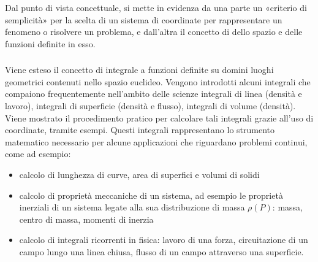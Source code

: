 \documentclass[letterpaper,10pt,italian]{jupyterBook}
\begin{document}
\sphinxAtStartPar
Dal punto di vista concettuale, si mette in evidenza da una parte un «criterio di semplicità» per la scelta di un sistema di coordinate per rappresentare un fenomeno o risolvere un problema, e dall’altra il concetto di  dello spazio e delle funzioni definite in esso.

\sphinxAtStartPar
  
\subsubsection*{}

\sphinxAtStartPar
Viene esteso il concetto di integrale a funzioni definite su domini \sphinxhyphen{} luoghi geometrici \sphinxhyphen{} contenuti nello spazio euclideo. Vengono introdotti alcuni integrali che compaiono frequentemente nell’ambito delle scienze \sphinxhyphen{} integrali di linea (densità e lavoro), integrali di superficie (densità e flusso), integrali di volume (densità). Viene mostrato il procedimento pratico per calcolare tali integrali grazie all’uso di coordinate, tramite esempi. Questi integrali rappresentano lo strumento matematico necessario per alcune applicazioni che riguardano problemi continui, come ad esempio:
\begin{itemize}
\item {} 
\sphinxAtStartPar
calcolo di lunghezza di curve, area di superfici e volumi di solidi

\item {} 
\sphinxAtStartPar
calcolo di proprietà meccaniche di un sistema, ad esempio le proprietà inerziali di un sistema legate alla sua distribuzione di massa \(\rho(P)\): massa, centro di massa, momenti di inerzia

\item {} 
\sphinxAtStartPar
calcolo di integrali ricorrenti in fisica: lavoro di una forza, circuitazione di un campo lungo una linea chiusa, flusso di un campo attraverso una superficie.

\end{itemize}
\subsubsection*{}
\end{document}
